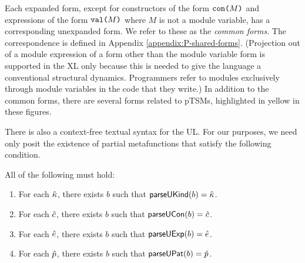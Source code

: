 Each expanded form, except for constructors of the form $\texttt{con}\texttt{(}M\texttt{)}$ and expressions of the form $\texttt{val}\texttt{(}M\texttt{)}$ where $M$ is not a module variable, has a corresponding unexpanded form. We refer to these as the \emph{common forms}. The correspondence is defined in Appendix \ref{appendix:P-shared-forms}. (Projection out of a module expression of a form other than the module variable form is supported in the XL only because this is needed to give the language  a conventional structural dynamics. Programmers refer to modules exclusively through module variables in the code that they write.) In addition to the common forms, there are several forms related to pTSMs, highlighted in yellow in these figures.

There is also a context-free textual syntax for the UL. For our purposes, we need only posit the existence of partial metafunctions that satisfy the following condition. 
\begingroup
\def\thetheorem{\ref{condition:textual-representability-P}}
\begin{condition} All of the following must hold:
\begin{enumerate}
\item For each ${\hat\kappa}$, there exists $b$ such that $\mathsf{parseUKind}(b)={\hat\kappa}$.
\item For each ${\hat c}$, there exists $b$ such that $\mathsf{parseUCon}(b)={\hat c}$.
\item For each ${\hat e}$, there exists $b$ such that $\mathsf{parseUExp}(b)={\hat e}$.
\item For each $\hat{p}$, there exists $b$ such that $\mathsf{parseUPat}(b)=\hat{p}$.
\end{enumerate}
\end{condition}
\endgroup

